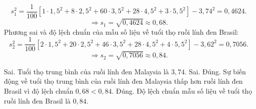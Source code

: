 \begin{ex}
{		$$s_{1}^{2} = \dfrac{1}{100}\left[1 \cdot 1{,}5^2 + 8 \cdot 2{,}5^2 + 60 \cdot 3{,}5^2 + 28 \cdot 4{,}5^2 + 3 \cdot 5{,}5^2 \right] - 3{,}74^{2} = 0{,}4624.$$
		$$\Rightarrow s_1 = \sqrt{0{,}4624} \approx 0{,}68.$$
		Phương sai và độ lệch chuẩn của mẫu số liệu về tuổi thọ ruồi lính đen Brasil:
		$$s_{2}^{2} = \dfrac{1}{100}\left[2 \cdot 1{,}5^2 + 20 \cdot 2{,}5^2 + 46 \cdot 3{,}5^2 + 28 \cdot 4{,}5^2 + 4 \cdot 5{,}5^2 \right] - 3{,}62^{2} = 0{,}7056.$$
		$$\Rightarrow s_2 = \sqrt{0{,}7056} \approx 0{,}84.$$
		\begin{itemchoice}
			\itemch Sai. Tuổi thọ trung bình của ruồi lính đen Malaysia là $3{,}74$.
			\itemch Sai.
			\itemch Đúng. Sự biến động về tuổi thọ trung bình của ruồi lính đen Malaysia thấp hơn ruồi lính đen Brasil vì độ lệch chuẩn $0{,}68 < 0{,}84$.
			\itemch Đúng. Độ lệch chuẩn mẫu số liệu về tuổi thọ ruồi lính đen Brasil là $0{,}84$.
		\end{itemchoice}
	}
\end{ex}

